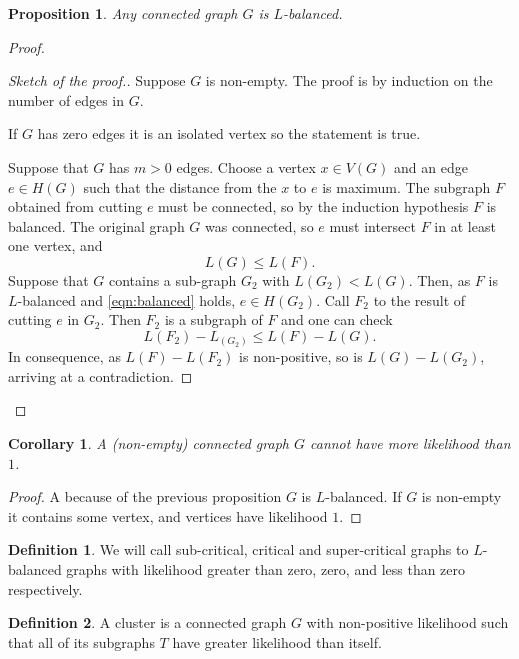 \documentclass[11pt,notitlepage]{report}
\newtheorem{proposition}{Proposition}[chapter]
\newtheorem{corollary}{Corollary}[chapter]
\theoremstyle{definition}
\newtheorem{definition}{Definition}[chapter]
\begin{document}
\begin{proposition} \label{prop:balanced}
	Any connected graph $G$ is $L$-balanced. 
\end{proposition}
\begin{proof}
	\begin{proof}[Sketch of the proof.]
		Suppose $G$ is non-empty.
		The proof is by induction on the number of edges in $G$. 
		\item If $G$ has zero edges it is an isolated vertex so the statement is true.
		\item Suppose that $G$ has $m>0$ edges. Choose a vertex $x\in V(G)$ and
		an edge $e\in H(G)$ such that the distance from the $x$ to $e$ is maximum. 
		The subgraph $F$ obtained from cutting $e$ must be connected, so by the
		induction hypothesis $F$ is balanced. 
		The original graph $G$ was connected, 
		so $e$ must intersect $F$ in at least one vertex, and
		\begin{equation}\label{eqn:balanced}
		L(G)\leq L(F).
		\end{equation}
		Suppose that $G$ contains a sub-graph $G_2$ with 
		$L(G_2)<L(G)$. Then, as $F$ is $L$-balanced and
		\ref{eqn:balanced} holds, $e\in H(G_2)$. Call $F_2$
		to the result of cutting $e$ in $G_2$. Then
		$F_2$ is a subgraph of $F$ and one can check
		\[ L(F_2) - L_(G_2) \leq L(F)-L(G).\]
		In consequence, as $L(F)-L(F_2)$ is non-positive, 
		so is $L(G)-L(G_2)$, arriving at a contradiction.
	\end{proof}
\end{proof}


\begin{corollary}
	A (non-empty) connected graph $G$ cannot have more likelihood than $1$.
\end{corollary}
\begin{proof}
	A because of the previous proposition $G$ is $L$-balanced.
	If $G$ is non-empty it contains some vertex,
	and vertices have likelihood $1$.
\end{proof}

\begin{definition} 
	We will call sub-critical, critical and super-critical
	graphs to $L$-balanced graphs with likelihood greater than
	zero, zero, and less than zero respectively. 
\end{definition}

\begin{definition}
	A cluster is a connected graph $G$ with non-positive likelihood such 
	that all of its subgraphs $T$ have greater likelihood
	than itself. 
\end{definition}
\end{document}
